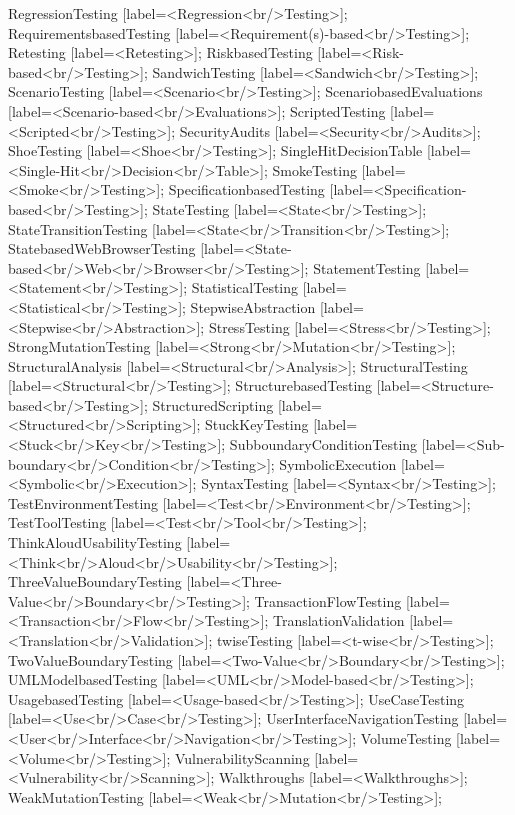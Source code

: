 \documentclass{article}
\begin{document}
{RegressionTesting [label=<Regression<br/>Testing>];
RequirementsbasedTesting [label=<Requirement(s)-based<br/>Testing>];
Retesting [label=<Retesting>];
RiskbasedTesting [label=<Risk-based<br/>Testing>];
SandwichTesting [label=<Sandwich<br/>Testing>];
ScenarioTesting [label=<Scenario<br/>Testing>];
ScenariobasedEvaluations [label=<Scenario-based<br/>Evaluations>];
ScriptedTesting [label=<Scripted<br/>Testing>];
SecurityAudits [label=<Security<br/>Audits>];
ShoeTesting [label=<Shoe<br/>Testing>];
SingleHitDecisionTable [label=<Single-Hit<br/>Decision<br/>Table>];
SmokeTesting [label=<Smoke<br/>Testing>];
SpecificationbasedTesting [label=<Specification-based<br/>Testing>];
StateTesting [label=<State<br/>Testing>];
StateTransitionTesting [label=<State<br/>Transition<br/>Testing>];
StatebasedWebBrowserTesting [label=<State-based<br/>Web<br/>Browser<br/>Testing>];
StatementTesting [label=<Statement<br/>Testing>];
StatisticalTesting [label=<Statistical<br/>Testing>];
StepwiseAbstraction [label=<Stepwise<br/>Abstraction>];
StressTesting [label=<Stress<br/>Testing>];
StrongMutationTesting [label=<Strong<br/>Mutation<br/>Testing>];
StructuralAnalysis [label=<Structural<br/>Analysis>];
StructuralTesting [label=<Structural<br/>Testing>];
StructurebasedTesting [label=<Structure-based<br/>Testing>];
StructuredScripting [label=<Structured<br/>Scripting>];
StuckKeyTesting [label=<Stuck<br/>Key<br/>Testing>];
SubboundaryConditionTesting [label=<Sub-boundary<br/>Condition<br/>Testing>];
SymbolicExecution [label=<Symbolic<br/>Execution>];
SyntaxTesting [label=<Syntax<br/>Testing>];
TestEnvironmentTesting [label=<Test<br/>Environment<br/>Testing>];
TestToolTesting [label=<Test<br/>Tool<br/>Testing>];
ThinkAloudUsabilityTesting [label=<Think<br/>Aloud<br/>Usability<br/>Testing>];
ThreeValueBoundaryTesting [label=<Three-Value<br/>Boundary<br/>Testing>];
TransactionFlowTesting [label=<Transaction<br/>Flow<br/>Testing>];
TranslationValidation [label=<Translation<br/>Validation>];
twiseTesting [label=<t-wise<br/>Testing>];
TwoValueBoundaryTesting [label=<Two-Value<br/>Boundary<br/>Testing>];
UMLModelbasedTesting [label=<UML<br/>Model-based<br/>Testing>];
UsagebasedTesting [label=<Usage-based<br/>Testing>];
UseCaseTesting [label=<Use<br/>Case<br/>Testing>];
UserInterfaceNavigationTesting [label=<User<br/>Interface<br/>Navigation<br/>Testing>];
VolumeTesting [label=<Volume<br/>Testing>];
VulnerabilityScanning [label=<Vulnerability<br/>Scanning>];
Walkthroughs [label=<Walkthroughs>];
WeakMutationTesting [label=<Weak<br/>Mutation<br/>Testing>];

}
\end{document}
